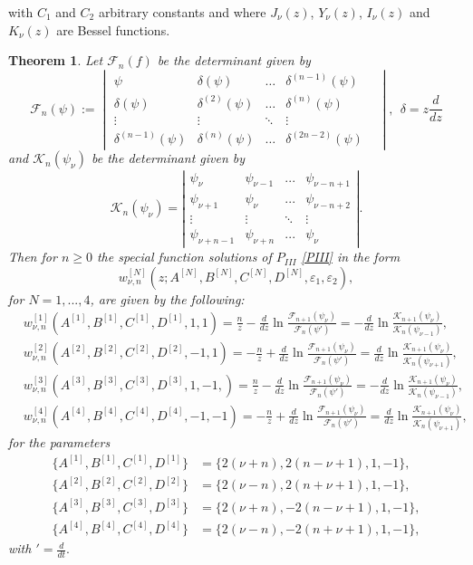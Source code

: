 \documentclass[12pt]{article}
\def\F{\mathcal{F}}
\def\K{\mathcal{K}}
\newtheorem{mydef}{Theorem}[section]
\numberwithin{figure}{section}
\numberwithin{equation}{section}
\numberwithin{table}{section}
\begin{document}
with $C_1$ and $C_2$ arbitrary constants and where $J_{\nu}(z)$, $Y_{\nu}(z)$, $I_{\nu}(z)$ and $K_{\nu}(z)$ are {Bessel functions}.
\begin{mydef}
Let $\F_{n}(f)$ be the determinant given by
\[
\mathcal{F}_n(\psi)\!:=\!\begin{vmatrix}
\psi & \delta(\psi) &\hdots& \delta^{(n-1)}(\psi) \\
\delta(\psi) & \delta^{(2)}(\psi) &\hdots& \delta^{(n)}(\psi)  \\
\vdots &\vdots & \ddots & \vdots & \\
\delta^{(n-1)}(\psi) & \delta^{(n)}(\psi) &\hdots& \delta^{(2n-2)}(\psi)
\end{vmatrix},~~\delta=z\frac{d}{dz}
\]
and $\mathcal{K}_n(\psi_\nu)$ be the determinant given by
\[
\mathcal{K}_n(\psi_\nu)\!=\!\left| \begin{array}{cccc}
\psi_{\nu} & \psi_{\nu-1} &  ...& \psi_{\nu-n+1} \\
\psi_{\nu+1} & \psi_{\nu} &  ...& \psi_{\nu-n+2} \\
\vdots &\vdots & \ddots & \vdots  \\
\psi_{\nu+n-1} & \psi_{\nu+n} & ...& \psi_{\nu}  \end{array} \right|.
\]
Then for $n\geq0$ the special function solutions of $P_{III}$ \eqref{PIII} in the form $$w^{[N]}_{\nu,n}(z;A^{[N]},B^{[N]},C^{[N]},D^{[N]},\varepsilon_1,\varepsilon_2),$$ for $N=1,...,4$, are given by the following:
\begin{subequations}
\begin{align*}
&w^{[1]}_{\nu,n}(A^{[1]},B^{[1]},C^{[1]},D^{[1]},1,1)=\tfrac{n}{z}-\frac{d}{dz}\ln\frac{\F_{n+1}(\psi_\nu)}{\F_n({\psi'})}=-\frac{d}{dz}\ln\frac{\K_{n+1}(\psi_\nu)}{\K_{n}(\psi_{\nu-1})},\\
&w^{[2]}_{\nu,n}(A^{[2]},B^{[2]},C^{[2]},D^{[2]},-1,1)=-\tfrac{n}{z}+\frac{d}{dz}\ln\frac{\F_{n+1}(\psi_\nu)}{\F_n({\psi'})}=\frac{d}{dz}\ln\frac{\K_{n+1}(\psi_\nu)}{\K_{n}(\psi_{\nu+1})},\\
&w^{[3]}_{\nu,n}(A^{[3]},B^{[3]},C^{[3]},D^{[3]},1,-1,)=\tfrac{n}{z}-\frac{d}{dz}\ln\frac{\F_{n+1}(\psi_\nu)}{\F_n({\psi'})}=-\frac{d}{dz}\ln\frac{\K_{n+1}(\psi_\nu)}{\K_{n}(\psi_{\nu-1})},\\
&w^{[4]}_{\nu,n}(A^{[4]},B^{[4]},C^{[4]},D^{[4]},-1,-1)=-\tfrac{n}{z}+\frac{d}{dz}\ln\frac{\F_{n+1}(\psi_\nu)}{\F_n({\psi'})}=\frac{d}{dz}\ln\frac{\K_{n+1}(\psi_\nu)}{\K_{n}(\psi_{\nu+1})},
\end{align*}
\end{subequations}
for the parameters
\begin{subequations}
\begin{align*}
\{A^{[1]},B^{[1]},C^{[1]},D^{[1]}\}&=\{2(\nu+n),2(n-\nu+1),1,-1\},\\
\{A^{[2]},B^{[2]},C^{[2]},D^{[2]}\}&=\{2(\nu-n),2(n+\nu+1),1,-1\},\\
\{A^{[3]},B^{[3]},C^{[3]},D^{[3]}\}&=\{2(\nu+n),-2(n-\nu+1),1,-1\},\\
\{A^{[4]},B^{[4]},C^{[4]},D^{[4]}\}&=\{2(\nu-n),-2(n+\nu+1),1,-1\},
\end{align*}
\end{subequations}
with $'=\frac{d}{dt}.$
\end{mydef}
\end{document}
